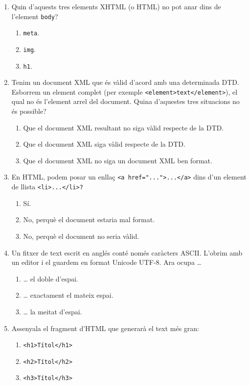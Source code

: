 \begin{enumerate}
 \item Quin d'aquests tres elements XHTML (o HTML) no pot anar dins de
   l'element \texttt{body}?
   \begin{enumerate}
   \item \texttt{meta}.
   \item \texttt{img}.
   \item \texttt{h1}.
   \end{enumerate}

 \item Tenim un document XML que és vàlid d'acord amb una determinada
   DTD. Esborrem un element complet (per exemple
   \texttt{<element>text</element>}), el qual no és l'element arrel
   del document. Quina d'aquestes tres situacions no és possible?
   \begin{enumerate}
   \item Que el document XML resultant no siga vàlid respecte de la
     DTD.
   \item Que el document XML siga vàlid respecte de la DTD.
   \item Que el document XML no siga un document XML ben format.
   \end{enumerate}

 \item En HTML, podem posar un enllaç \texttt{<a
     href="..."}\texttt{>...</a>} dins d'un element de llista
   \texttt{<li>...</li>?}
   \begin{enumerate}
   \item Sí.
   \item No, perquè el document estaria mal format.
   \item No, perquè el document no seria vàlid.
   \end{enumerate}

 \item Un fitxer de text escrit en anglés conté només caràcters
   ASCII. L'obrim amb un editor i el guardem en format Unicode
   UTF-8. Ara ocupa {\ldots}
  \begin{enumerate}
  \item {\ldots} el doble d'espai.
  \item {\ldots} exactament el mateix espai.
  \item {\ldots} la meitat d'espai.
  \end{enumerate}

\item Assenyala el fragment d'HTML que generarà el text més gran:
  \begin{enumerate}
  \item \texttt{<h1>Títol</h1>}
  \item \texttt{<h2>Títol</h2>}
  \item \texttt{<h3>Títol</h3>}
  \end{enumerate}


\end{enumerate}
